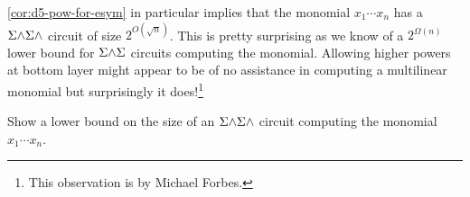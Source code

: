 \autoref{cor:d5-pow-for-esym} in particular implies that the monomial
$x_1\cdots x_n$ has a $\Sigma\mathord{\wedge}\Sigma\mathord{\wedge}$ circuit of size $2^{O(\sqrt{n})}$.
This is pretty surprising as we know of a $2^{\Omega(n)}$ lower bound
for $\Sigma\mathord{\wedge}\Sigma$ circuits computing the monomial.
Allowing higher powers at bottom layer might appear to be of no
assistance in computing a multilinear monomial but surprisingly it
does!\footnote{This observation is by Michael Forbes. }

\begin{openproblem}
Show a lower bound on the size of an $\Sigma\mathord{\wedge}\Sigma\mathord{\wedge}$ circuit computing the monomial $x_1\cdots x_n$. 
\end{openproblem}


